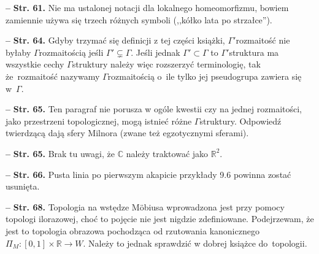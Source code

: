 \documentclass[a4paper,11pt]{article}
\newcommand{\mb}{\mathbb}
\newcommand{\tb}{\textbf}
\newcommand{\noi}{\noindent}
\newcommand{\start}{\noi \tb{--} {}}
\newcommand{\Str}[1]{\tb{Str. #1.}}
\begin{document}
\start \Str{61} Nie ma ustalonej notacji dla lokalnego homeomorfizmu,
bowiem zamiennie używa się trzech różnych symboli (,,kółko lata po
strzałce'').

\start \Str{64} Gdyby trzymać się definicji z tej części książki,
$\Gamma'$\dywiz rozmaitość nie byłaby $\Gamma$\dywiz rozmaitością
jeśli $\Gamma' \subsetneq \Gamma$. Jeśli jednak
$\Gamma' \subset \Gamma$ to $\Gamma'$\dywiz struktura ma wszystkie
cechy $\Gamma$\dywiz struktury należy więc rozszerzyć terminologię,
tak że~rozmaitość nazywamy $\Gamma$\dywiz rozmaitością o~ile tylko jej
pseudogrupa zawiera się w~$\Gamma$.

\start \Str{65} Ten paragraf nie porusza w ogóle kwestii czy na jednej
rozmaitości, jako przestrzeni topologicznej, mogą istnieć różne
$\Gamma$\dywiz struktury. Odpowiedź twierdzącą dają sfery Milnora
(zwane też egzotycznymi sferami).

\start \Str{65} Brak tu uwagi, że $\mb{C}$ należy traktować jako
$\mathbb{R}^{ 2 }$.

\start \Str{66} Pusta linia po pierwszym akapicie przykłady 9.6
powinna zostać usunięta.


\start \Str{68} Topologia na wstędze M\"obiusa wprowadzona jest przy
pomocy topologi ilorazowej, choć to pojęcie nie jest nigdzie
zdefiniowane. Podejrzewam, że jest to topologia obrazowa pochodząca od
rzutowania kanonicznego
$\Pi_{ M } : [ 0,1 ] \times \mathbb{ R } \rightarrow W$. Należy to
jednak sprawdzić w dobrej książce do~topologii.
\end{document}
